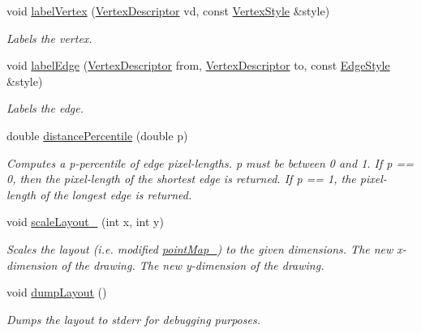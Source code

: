 \begin{DoxyCompactItemize}
void \hyperlink{structDrawer_a5236ae6a77fa0e8b51b6b495c9eecc3e}{label\+Vertex} (\hyperlink{structDrawer_a5bccdf5b5e846fb1a958dca6b5f0a1f6}{Vertex\+Descriptor} vd, const \hyperlink{structVertexStyle}{Vertex\+Style} \&style)
\begin{DoxyCompactList}\small\item\em Labels the vertex. \end{DoxyCompactList}\item 
void \hyperlink{structDrawer_a4cac975f28f1a9afa284d50cd56070df}{label\+Edge} (\hyperlink{structDrawer_a5bccdf5b5e846fb1a958dca6b5f0a1f6}{Vertex\+Descriptor} from, \hyperlink{structDrawer_a5bccdf5b5e846fb1a958dca6b5f0a1f6}{Vertex\+Descriptor} to, const \hyperlink{structEdgeStyle}{Edge\+Style} \&style)
\begin{DoxyCompactList}\small\item\em Labels the edge. \end{DoxyCompactList}\item 
double \hyperlink{structDrawer_a4f5fb8bc23a21740019e05875fb1ec74}{distance\+Percentile} (double p)
\begin{DoxyCompactList}\small\item\em Computes a p-\/percentile of edge pixel-\/lengths. p must be between 0 and 1. If p == 0, then the pixel-\/length of the shortest edge is returned. If p == 1, the pixel-\/length of the longest edge is returned. \end{DoxyCompactList}\item 
void \hyperlink{structDrawer_a6b1a70d8bc2fcf5060fb8ce48440351d}{scale\+Layout\+\_\+} (int x, int y)\hypertarget{structDrawer_a6b1a70d8bc2fcf5060fb8ce48440351d}{}\label{structDrawer_a6b1a70d8bc2fcf5060fb8ce48440351d}

\begin{DoxyCompactList}\small\item\em Scales the layout (i.\+e. modified \hyperlink{structDrawer_ab1a5cc1a964c099bd30b5239d9188c99}{point\+Map\+\_\+}) to the given dimensions. The new x-\/dimension of the drawing. The new y-\/dimension of the drawing. \end{DoxyCompactList}\item 
void \hyperlink{structDrawer_af67a222ef8bec63a37bcbd8ccb88560d}{dump\+Layout} ()\hypertarget{structDrawer_af67a222ef8bec63a37bcbd8ccb88560d}{}\label{structDrawer_af67a222ef8bec63a37bcbd8ccb88560d}

\begin{DoxyCompactList}\small\item\em Dumps the layout to stderr for debugging purposes. \end{DoxyCompactList}\end{DoxyCompactItemize}
